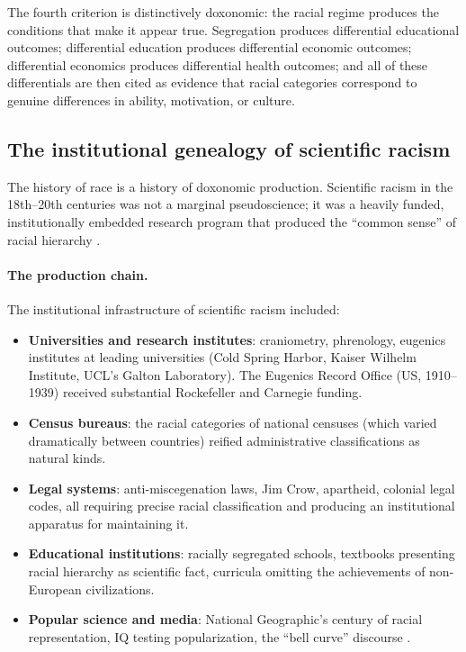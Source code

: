 The fourth criterion is distinctively doxonomic: the racial regime produces the conditions that make it appear true.
Segregation produces differential educational outcomes; differential education produces differential economic outcomes; differential economics produces differential health outcomes; and all of these differentials are then cited as evidence that racial categories correspond to genuine differences in ability, motivation, or culture.

\subsection{The institutional genealogy of scientific racism}

The history of race is a history of doxonomic production.
Scientific racism in the 18th--20th centuries was not a marginal pseudoscience; it was a heavily funded, institutionally embedded research program that produced the ``common sense'' of racial hierarchy \autocite{dubois1903}.

\paragraph{The production chain.}
The institutional infrastructure of scientific racism included:
\begin{itemize}[nosep]
  \item \textbf{Universities and research institutes}: craniometry, phrenology, eugenics institutes at leading universities (Cold Spring Harbor, Kaiser Wilhelm Institute, UCL's Galton Laboratory). The Eugenics Record Office (US, 1910--1939) received substantial Rockefeller and Carnegie funding.
  \item \textbf{Census bureaus}: the racial categories of national censuses (which varied dramatically between countries) reified administrative classifications as natural kinds.
  \item \textbf{Legal systems}: anti-miscegenation laws, Jim Crow, apartheid, colonial legal codes, all requiring precise racial classification and producing an institutional apparatus for maintaining it.
  \item \textbf{Educational institutions}: racially segregated schools, textbooks presenting racial hierarchy as scientific fact, curricula omitting the achievements of non-European civilizations.
  \item \textbf{Popular science and media}: National Geographic's century of racial representation, IQ testing popularization, the ``bell curve'' discourse \autocite{herrnstein1994}.
\end{itemize}

